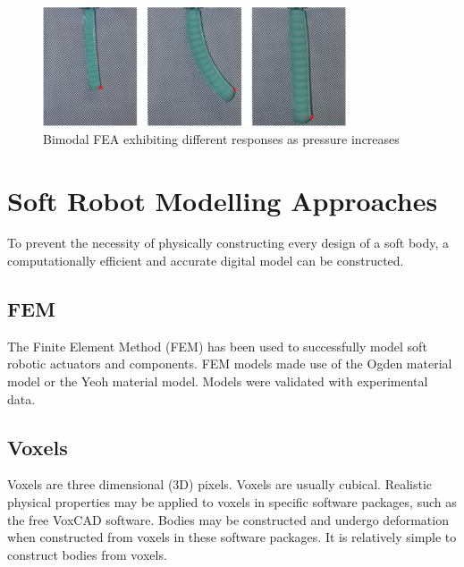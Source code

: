 \begin{figure}[H]
	\centering
	\includegraphics[width=0.8\textwidth]{BimodalActuator.png}
	\caption[Bimodal FEA responses]{Bimodal FEA exhibiting different responses as pressure increases \citep{Ellis2020}}
	\label{fig:bifea}
\end{figure}

\section{Soft Robot Modelling Approaches}

To prevent the necessity of physically constructing every design of a soft body, a computationally efficient and accurate digital model can be constructed.

\subsection{FEM}

The Finite Element Method (FEM) has been used to successfully model soft robotic actuators and components. FEM models made use of the Ogden material model or the Yeoh material model. Models were validated with experimental data. \citep{Elsayed2014, Runge2017}

\subsection{Voxels}

Voxels are three dimensional (3D) pixels. Voxels are usually cubical. Realistic physical properties may be applied to voxels in specific software packages, such as the free VoxCAD software. Bodies may be constructed and undergo deformation when constructed from voxels in these software packages. It is relatively simple to construct bodies from voxels. \citep{Cheney2013,Cheney2015}

